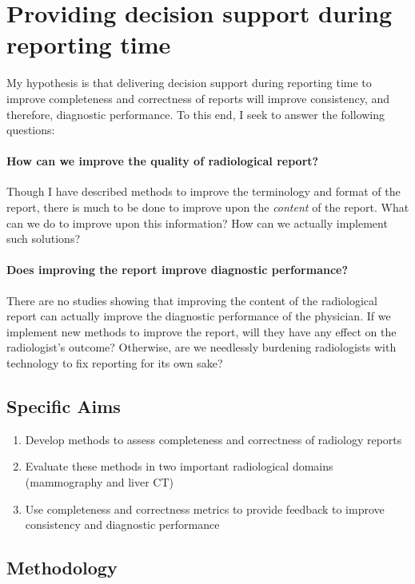 \section{Providing decision support during reporting time}

My hypothesis is that delivering decision support during reporting time to improve completeness and correctness of reports will improve consistency, and therefore, diagnostic performance. To this end, I seek to answer the following questions:

\paragraph{How can we improve the quality of radiological report?}

Though I have described methods to improve the terminology and format of the report, there is much to be done to improve upon the \emph{content} of the report. What can we do to improve upon this information? How can we actually implement such solutions?

\paragraph{Does improving the report improve diagnostic performance?}

There are no studies showing that improving the content of the radiological report can actually improve the diagnostic performance of the physician. If we implement new methods to improve the report, will they have any effect on the radiologist's outcome? Otherwise, are we needlessly burdening radiologists with technology to fix reporting for its own sake?

\subsection{Specific Aims}

\begin{enumerate}
	\item Develop methods to assess completeness and correctness of radiology reports
	\item Evaluate these methods in two important radiological domains (mammography and liver CT)
	\item Use completeness and correctness metrics to provide feedback to improve consistency and diagnostic performance
\end{enumerate}

\subsection{Methodology}

